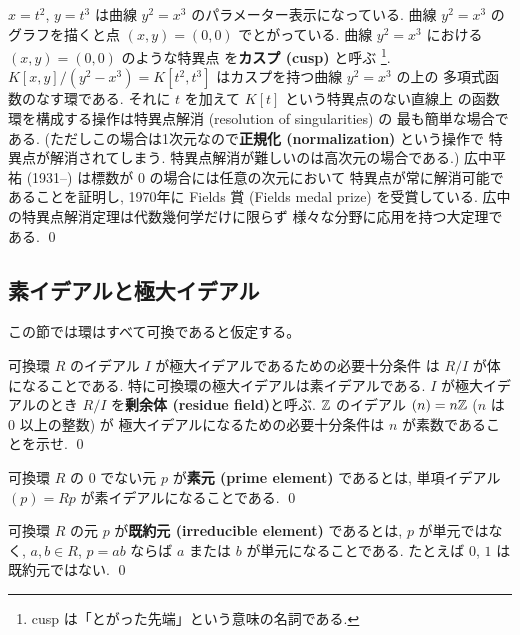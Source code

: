 \documentclass[12pt,twoside]{jarticle}
\begin{document}
\begin{guide}
$x=t^2$, $y=t^3$ は曲線 $y^2=x^3$ のパラメーター表示になっている.
曲線 $y^2=x^3$ のグラフを描くと点 $(x,y)=(0,0)$ でとがっている.
曲線 $y^2=x^3$ における $(x,y)=(0,0)$ のような特異点
を{\bf カスプ (cusp)} と呼ぶ%
\footnote{cusp は「とがった先端」という意味の名詞である.}.
$K[x,y]/(y^2-x^3)=K[t^2,t^3]$ はカスプを持つ曲線 $y^2=x^3$ の上の
多項式函数のなす環である.  
それに $t$ を加えて $K[t]$ という特異点のない直線上
の函数環を構成する操作は特異点解消 (resolution of singularities) の
最も簡単な場合である. 
(ただしこの場合は1次元なので{\bf 正規化 (normalization)} という操作で
特異点が解消されてしまう. 特異点解消が難しいのは高次元の場合である.)
広中平祐 (1931--) は標数が $0$ の場合には任意の次元において
特異点が常に解消可能であることを証明し, 
1970年に Fields 賞 (Fields medal prize) を受賞している.
広中の特異点解消定理は代数幾何学だけに限らず
様々な分野に応用を持つ大定理である.
\qed
\end{guide}


\subsection{素イデアルと極大イデアル}

この節では環はすべて可換であると仮定する。

\begin{question}[極大イデアルと剰余体]
 可換環 $R$ のイデアル $I$ が極大イデアルであるための必要十分条件
 は $R/I$ が体になることである. 
 特に可換環の極大イデアルは素イデアルである.
 $I$ が極大イデアルのとき $R/I$ を{\bf 剰余体 (residue field)}と呼ぶ.
 ${\mathbb Z}$ のイデアル $(n)=n{\mathbb Z}$ ($n$ は $0$ 以上の整数) が
 極大イデアルになるための必要十分条件は $n$ が素数であることを示せ.
 \qed
\end{question}

\begin{definition}[素元]
 可換環 $R$ の $0$ でない元 $p$ が{\bf 素元 (prime element)} であるとは, %
 単項イデアル $(p)=Rp$ が素イデアルになることである.
 \qed
\end{definition}

\begin{definition}[既約元]
 可換環 $R$ の元 $p$ が{\bf 既約元 (irreducible element)} であるとは, %
 $p$ が単元ではなく, 
 $a,b\in R$, $p=ab$ ならば $a$ または $b$ が単元になることである.
 たとえば $0$, $1$ は既約元ではない.
 \qed
\end{definition}
\end{document}
